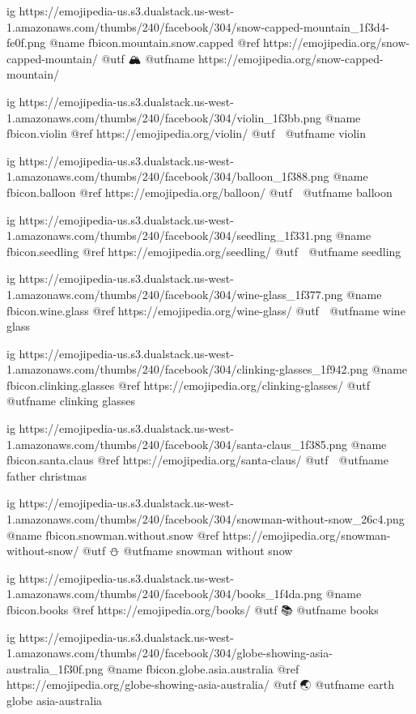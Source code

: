   ig https://emojipedia-us.s3.dualstack.us-west-1.amazonaws.com/thumbs/240/facebook/304/snow-capped-mountain_1f3d4-fe0f.png
  @name fbicon.mountain.snow.capped
  @ref https://emojipedia.org/snow-capped-mountain/
  @utf 🏔
  @utfname https://emojipedia.org/snow-capped-mountain/

  ig https://emojipedia-us.s3.dualstack.us-west-1.amazonaws.com/thumbs/240/facebook/304/violin_1f3bb.png
  @name fbicon.violin
  @ref https://emojipedia.org/violin/
  @utf 🎻
  @utfname violin

  ig https://emojipedia-us.s3.dualstack.us-west-1.amazonaws.com/thumbs/240/facebook/304/balloon_1f388.png
  @name fbicon.balloon
  @ref https://emojipedia.org/balloon/
  @utf 🎈
  @utfname balloon

  ig https://emojipedia-us.s3.dualstack.us-west-1.amazonaws.com/thumbs/240/facebook/304/seedling_1f331.png
  @name fbicon.seedling
  @ref https://emojipedia.org/seedling/
  @utf 🌱
  @utfname seedling

  ig https://emojipedia-us.s3.dualstack.us-west-1.amazonaws.com/thumbs/240/facebook/304/wine-glass_1f377.png
  @name fbicon.wine.glass
  @ref https://emojipedia.org/wine-glass/
  @utf 🍷
  @utfname wine glass

  ig https://emojipedia-us.s3.dualstack.us-west-1.amazonaws.com/thumbs/240/facebook/304/clinking-glasses_1f942.png
  @name fbicon.clinking.glasses
  @ref https://emojipedia.org/clinking-glasses/
  @utf 🥂
  @utfname clinking glasses

  ig https://emojipedia-us.s3.dualstack.us-west-1.amazonaws.com/thumbs/240/facebook/304/santa-claus_1f385.png
  @name fbicon.santa.claus
  @ref https://emojipedia.org/santa-claus/
  @utf 🎅
  @utfname father christmas

  ig https://emojipedia-us.s3.dualstack.us-west-1.amazonaws.com/thumbs/240/facebook/304/snowman-without-snow_26c4.png
  @name fbicon.snowman.without.snow
  @ref https://emojipedia.org/snowman-without-snow/
  @utf ⛄
  @utfname snowman without snow

  ig https://emojipedia-us.s3.dualstack.us-west-1.amazonaws.com/thumbs/240/facebook/304/books_1f4da.png
  @name fbicon.books
  @ref https://emojipedia.org/books/
  @utf 📚
  @utfname books

  ig https://emojipedia-us.s3.dualstack.us-west-1.amazonaws.com/thumbs/240/facebook/304/globe-showing-asia-australia_1f30f.png
  @name fbicon.globe.asia.australia
  @ref https://emojipedia.org/globe-showing-asia-australia/
  @utf 🌏
  @utfname earth globe asia-australia

